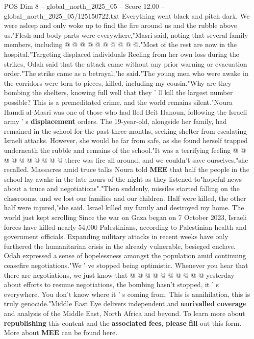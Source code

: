 \begin{textsample}{POS Dim 8 – global\_north\_2025\_05 – Score 12.00 – global\_north\_2025\_05/125150722.txt}
Everything went black and pitch dark.
We were asleep and only woke up to find the fire around us and the rubble above us."Flesh and body parts were everywhere,"Masri said, noting that several family members, including @ @ @ @ @ @ @ @ @ @."Most of the rest are now in the hospital."Targeting displaced individuals Reeling from her own loss during the strikes, Odah said that the attack came without any prior warning or evacuation order."The strike came as a betrayal,"he said."The young men who were awake in the corridors were torn to pieces, killed, including my cousin."Why are they bombing the shelters, knowing full well that they ' ll kill the largest number possible?
This is a premeditated crime, and the world remains silent."Noura Hamdi al-Masri was one of those who had fled Beit Hanoun, following the Israeli army ' s \textbf{displacement} orders.
The 19-year-old, alongside her family, had remained in the school for the past three months, seeking shelter from escalating Israeli attacks.
However, she would be far from safe, as she found herself trapped underneath the rubble and remains of the school."It was a terrifying feeling @ @ @ @ @ @ @ @ @ @ there was fire all around, and we couldn't save ourselves,"she recalled.
Massacres amid truce talks Noura told \textbf{MEE} that half the people in the school lay awake in the late hours of the night as they listened to"hopeful news about a truce and negotiations"."Then suddenly, missiles started falling on the classrooms, and we lost our families and our children.
Half were killed, the other half were injured,"she said.
Israel killed my family and destroyed my home.
The world just kept scrolling Since the war on Gaza began on 7 October 2023, Israeli forces have killed nearly 54,000 Palestinians, according to Palestinian health and government officials.
Expanding military attacks in recent weeks have only furthered the humanitarian crisis in the already vulnerable, besieged enclave.
Odah expressed a sense of hopelessness amongst the population amid continuing ceasefire negotiations."We ' ve stopped being optimistic.
Whenever you hear that there are negotiations, we just know that @ @ @ @ @ @ @ @ @ @ yesterday about efforts to resume negotiations, the bombing hasn't stopped, it ' s everywhere.
You don't know where it ' s coming from.
This is annihilation, this is truly genocide."Middle East Eye delivers independent and \textbf{unrivalled} \textbf{coverage} and analysis of the Middle East, North Africa and beyond.
To learn more about \textbf{republishing} this content and the \textbf{associated} \textbf{fees}, \textbf{please} \textbf{fill} out this form.
More about \textbf{MEE} can be found here.

\end{textsample}
